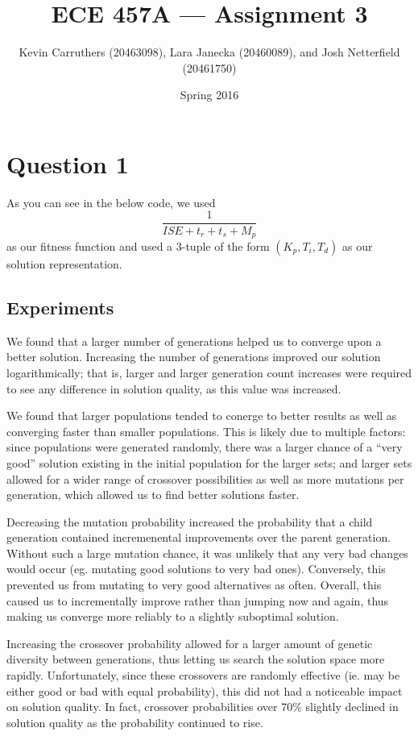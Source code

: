 \documentclass[12pt]{article}
\begin{document}
\title{ECE 457A --- Assignment 3}
\author{Kevin Carruthers (20463098), Lara Janecka (20460089), and Josh Netterfield (20461750)}
\date{\vspace{-2ex}Spring 2016}
\maketitle\HRule

\section*{Question 1}
As you can see in the below code, we used \[ \frac{1}{ISE + t_r + t_s + M_p} \] as our fitness function and used a 3-tuple of the form $(K_p, T_i, T_d)$ as our solution representation.



\subsection*{Experiments}
We found that a larger number of generations helped us to converge upon a better solution. Increasing the number of generations improved our solution logarithmically; that is, larger and larger generation count increases were required to see any difference in solution quality, as this value was increased.

We found that larger populations tended to conerge to better results as well as converging faster than smaller populations. This is likely due to multiple factors: since populations were generated randomly, there was a larger chance of a ``very good'' solution existing in the initial population for the larger sets; and larger sets allowed for a wider range of crossover possibilities as well as more mutations per generation, which allowed us to find better solutions faster.

Decreasing the mutation probability increased the probability that a child generation contained incremenental improvements over the parent generation. Without such a large mutation chance, it was unlikely that any very bad changes would occur (eg. mutating good solutions to very bad ones). Conversely, this prevented us from mutating to very good alternatives as often. Overall, this caused us to incrementally improve rather than jumping now and again, thus making us converge more reliably to a slightly suboptimal solution.

Increasing the crossover probability allowed for a larger amount of genetic diversity between generations, thus letting us search the solution space more rapidly. Unfortunately, since these crossovers are randomly effective (ie. may be either good or bad with equal probability), this did not had a noticeable impact on solution quality. In fact, crossover probabilities over 70\% slightly declined in solution quality as the probability continued to rise.
\end{document}
